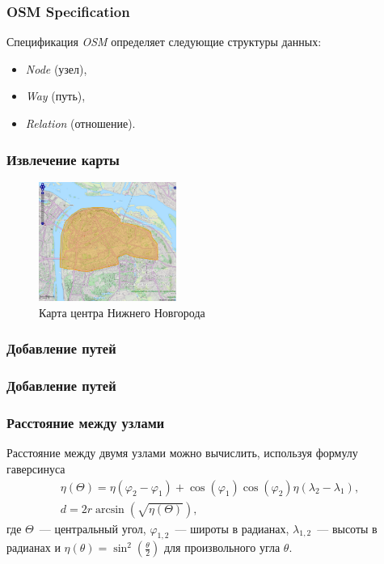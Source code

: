 \documentclass{beamer}
\begin{document}
\begin{frame}
\frametitle{OSM Specification}
Спецификация \textit{OSM} определяет следующие структуры данных:
\begin{itemize}
\item \textit{Node} (узел),
\item \textit{Way} (путь),
\item \textit{Relation} (отношение).
\end{itemize}
\end{frame}

\begin{frame}
\frametitle{Извлечение карты}
\begin{figure}[ht]
\centering	
\includegraphics[width=0.4\textwidth]{images/bbbike.png}
\caption{Карта центра Нижнего Новгорода}
\label{fig:bbbike}
\end{figure}
\end{frame}

\begin{frame}[fragile]
\frametitle{Добавление путей}

\end{frame}

\begin{frame}[fragile]
\frametitle{Добавление путей}

\end{frame}

\begin{frame}
\frametitle{Расстояние между узлами}
Расстояние между двумя узлами можно вычислить, используя формулу гаверсинуса
\begin{gather*}
	\eta(\Theta) = \eta(\varphi_2 - \varphi_1) + \cos(\varphi_1) \cos(\varphi_2) \eta(\lambda_2 - \lambda_1), \\
	d = 2r \arcsin(\sqrt{\eta(\Theta)}),
\end{gather*}
	где $ \Theta $~--- центральный угол, $ \varphi_{1,2} $~--- широты в радианах, $ \lambda_{1,2} $~--- высоты в радианах и $ \eta(\theta) = \sin^2\left(\frac{\theta}{2}\right) $ для произвольного угла $ \theta $.
\end{frame}
\end{document}
